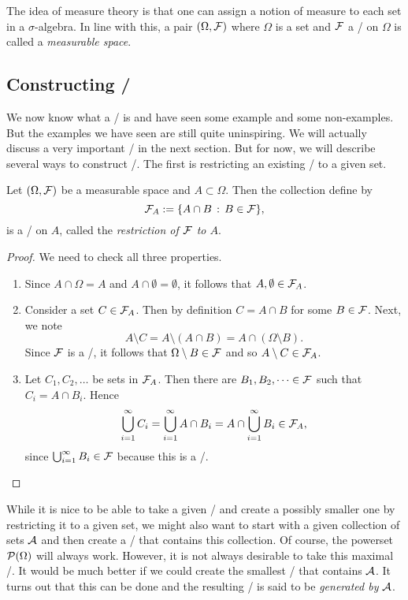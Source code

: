 The idea of measure theory is that one can assign a notion of measure to each set in a $\sigma$-algebra. In line with this, a pair $(\Omega, \mathcal F)$ where $\Omega$ is a set and $\mathcal F$ a \sigalg/ on $\Omega$ is called a \emph{measurable space}. 

\subsection{Constructing \sigalgs/}\label{ssec:construction_sigalgs}

We now know what a \sigalg/ is and have seen some example and some non-examples. But the examples we have seen are still quite uninspiring. We will actually discuss a very important \sigalg/ in the next section. But for now, we will describe several ways to construct \sigalgs/. The first is restricting an existing \sigalg/ to a given set.

\begin{lemma}\label{lem:restriction_sigma_algebra}
Let $(\Omega, \mathcal F)$ be a measurable space and $A \subset \Omega$. Then the collection define by 
\[
	\mathcal F_A := \{A \cap B \, : \, B \in \mathcal F\},
\]
is a \sigalg/ on $A$, called the \emph{restriction of $\mathcal F$ to $A$}.
\end{lemma}

\begin{proof}
We need to check all three properties.
\begin{enumerate}
\item Since $A \cap \Omega = A$ and $A \cap \emptyset = \emptyset$, it follows that $A, \emptyset \in \mathcal F_A$.
\item Consider a set $C \in \mathcal F_A$. Then by definition $C = A \cap B$ for some $B \in \mathcal F$. Next, we note
\[
	A \setminus C = A \setminus (A \cap B) = A \cap (\Omega \setminus B).
\]
Since $\mathcal F$ is a \sigalg/, it follows that $\Omega \setminus B \in \mathcal F$ and so $A \setminus C \in \mathcal F_A$.
\item Let $C_1, C_2, \dots$ be sets in $\mathcal F_A$. Then there are $B_1, B_2, \dots \in \mathcal F$ such that $C_i = A \cap B_i$. Hence
\[
	\bigcup_{i=1}^\infty C_i = \bigcup_{i=1}^\infty A \cap B_i = A \cap \bigcup_{i=1}^\infty B_i \in \mathcal F_A,
\]
since $\bigcup_{i=1}^\infty B_i \in \mathcal F$ because this is a \sigalg/.
\end{enumerate}
\end{proof}

While it is nice to be able to take a given \sigalg/ and create a possibly smaller one by restricting it to a given set, we might also want to start with a given collection of sets $\mathcal A$ and then create a \sigalg/ that contains this collection. Of course, the powerset $\mathcal P(\Omega)$ will always work. However, it is not always desirable to take this maximal \sigalg/. It would be much better if we could create the smallest \sigalg/ that contains $\mathcal A$. It turns out that this can be done and the resulting \sigalg/ is said to be \emph{generated by $\mathcal A$}. 

